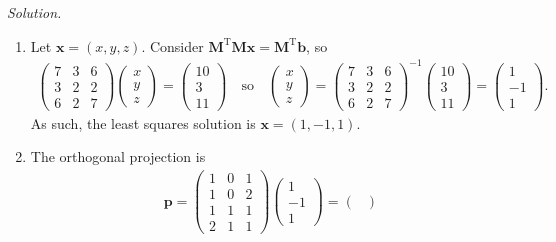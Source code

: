 \documentclass[12pt]{article}
\begin{document}
\noindent\emph{Solution.}\begin{enumerate}[label=\textbf{(\alph*)}]
    \itemsep 0em
    \item Let $\mathbf{x}=\left(x,y,z\right)$. Consider $\mathbf{M}^\text{T}\mathbf{Mx}=\mathbf{M}^\text{T}\mathbf{b}$, so \begin{align*}
        \begin{pmatrix}7&3&6\\ 3&2&2\\ 6&2&7\end{pmatrix}\begin{pmatrix}
            x\\y\\z
        \end{pmatrix}=\begin{pmatrix}10\\ 3\\ 11\end{pmatrix}\quad\text{so}\quad \begin{pmatrix}
            x\\y\\z
        \end{pmatrix}= \begin{pmatrix}7&3&6\\ 3&2&2\\ 6&2&7\end{pmatrix}^{-1}\begin{pmatrix}10\\ 3\\ 11\end{pmatrix}=\begin{pmatrix}1\\ -1\\ 1\end{pmatrix}.
    \end{align*}
    As such, the least squares solution is $\mathbf{x}=\left(1,-1,1\right)$.
    \item The orthogonal projection is \begin{align*}
        \mathbf{p}=\begin{pmatrix}
    1 & 0 & 1\\
    1 & 0 & 2\\
    1 & 1 & 1\\
    2 & 1 & 1
  \end{pmatrix}\begin{pmatrix}
      1\\-1\\1
  \end{pmatrix}=\begin{pmatrix}

\end{pmatrix}
\end{align*}
\end{enumerate}
\end{document}
